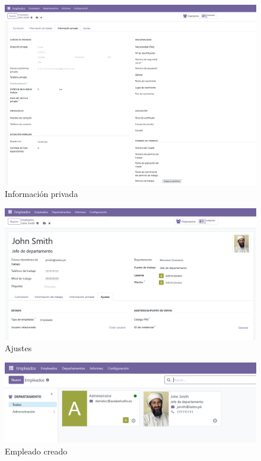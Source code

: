 \documentclass[a4paper,12pt]{article}
\begin{document}
\begin{figure}[h!]
    \centering
    \includegraphics[width=1\textwidth]{pr2odoo16-informacionPrivada.png}
    \caption{Información privada}
\end{figure}
\FloatBarrier

\begin{figure}[h!]
    \centering
    \includegraphics[width=1\textwidth]{pr2odoo17-ajustes.png}
    \caption{Ajustes}
\end{figure}
\FloatBarrier

\begin{figure}[h!]
    \centering
    \includegraphics[width=1\textwidth]{pr2odoo18-empleadoCreado.png}
    \caption{Empleado creado}
\end{figure}
\FloatBarrier
\end{document}
